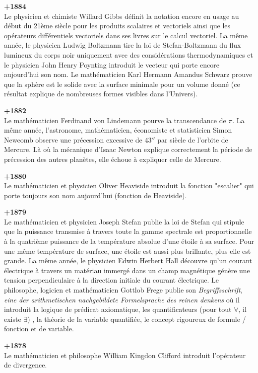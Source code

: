 \textbf{+1884}\\
Le physicien et chimiste Willard Gibbs définit la notation encore en usage au début du 21ème siècle pour les produits scalaires et vectoriels ainsi que les opérateurs différentiels vectoriels dans ses livres sur le calcul vectoriel. La même année, le physicien Ludwig Boltzmann tire la loi de  Stefan-Boltzmann du flux lumineux du corps noir uniquement avec des considérations thermodynamiques et le physicien John Henry Poynting introduit le vecteur qui porte encore aujourd'hui son nom. Le mathématicien Karl Hermann Amandus Schwarz prouve que la sphère est le solide avec la surface minimale pour un volume donné (ce résultat explique de nombreuses formes visibles dans l'Univers).

\textbf{+1882}\\
Le mathématicien Ferdinand von Lindemann pourve la transcendance de $\pi $. La même année, l'astronome, mathématicien, économiste et statisticien Simon Newcomb observe une précession excessive de $43''$ par siècle de l'orbite de Mercure. Là où la mécanique d'Isaac Newton explique correctement la période de précession des autres planètes, elle échoue à expliquer celle de Mercure.

\textbf{+1880}\\
Le mathématicien et physicien Oliver Heaviside introduit la fonction "escalier" qui porte toujours son nom aujourd'hui (fonction de Heaviside).

\textbf{+1879}\\
Le mathématicien et physicien Joseph Stefan publie la loi de Stefan qui stipule que la puissance transmise à travers toute la gamme spectrale est proportionnelle à la quatrième puissance de la température absolue d'une étoile à sa surface. Pour une même température de surface, une étoile est aussi plus brillante, plus elle est grande. La même année, le physicien Edwin Herbert Hall découvre qu'un courant électrique à travers un matériau immergé dans un champ magnétique génère une tension perpendiculaire à la direction initiale du courant électrique. Le philosophe, logicien et mathématicien Gottlob Frege publie son \textit{Begriffsschrift, eine der arithmetischen nachgebildete Formelsprache des reinen denkens} où il introduit la logique de prédicat axiomatique, les quantificateurs (pour tout $\forall$, il existe $\exists$) , la théorie de la variable quantifiée, le concept rigoureux de formule / fonction et de variable.

\textbf{+1878}\\
Le mathématicien et philosophe William Kingdon Clifford introduit l'opérateur de divergence.

